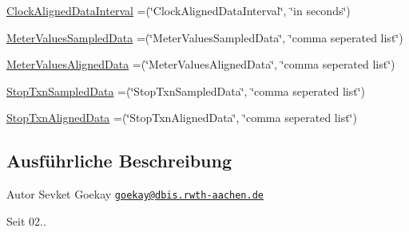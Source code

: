 \begin{DoxyCompactItemize}
\item 
\hyperlink{enumde_1_1rwth_1_1idsg_1_1steve_1_1web_1_1dto_1_1ocpp15_1_1_configuration_key_enum_a07d1dbf64e1bb3c3b50f09bada11d31d}{Clock\-Aligned\-Data\-Interval} =(\char`\"{}Clock\-Aligned\-Data\-Interval\char`\"{}, \char`\"{}in seconds\char`\"{})
\item 
\hyperlink{enumde_1_1rwth_1_1idsg_1_1steve_1_1web_1_1dto_1_1ocpp15_1_1_configuration_key_enum_ad95d1535d068131de3ce7769885d5e16}{Meter\-Values\-Sampled\-Data} =(\char`\"{}Meter\-Values\-Sampled\-Data\char`\"{}, \char`\"{}comma seperated list\char`\"{})
\item 
\hyperlink{enumde_1_1rwth_1_1idsg_1_1steve_1_1web_1_1dto_1_1ocpp15_1_1_configuration_key_enum_ac9e6b9e49500040c370a101ea6c8d71a}{Meter\-Values\-Aligned\-Data} =(\char`\"{}Meter\-Values\-Aligned\-Data\char`\"{}, \char`\"{}comma seperated list\char`\"{})
\item 
\hyperlink{enumde_1_1rwth_1_1idsg_1_1steve_1_1web_1_1dto_1_1ocpp15_1_1_configuration_key_enum_ac518bfd2cc29fef1a5d331b4819e72d8}{Stop\-Txn\-Sampled\-Data} =(\char`\"{}Stop\-Txn\-Sampled\-Data\char`\"{}, \char`\"{}comma seperated list\char`\"{})
\item 
\hyperlink{enumde_1_1rwth_1_1idsg_1_1steve_1_1web_1_1dto_1_1ocpp15_1_1_configuration_key_enum_a81e4a64dd31a431a1ca5b118f431e18a}{Stop\-Txn\-Aligned\-Data} =(\char`\"{}Stop\-Txn\-Aligned\-Data\char`\"{}, \char`\"{}comma seperated list\char`\"{})
\end{DoxyCompactItemize}


\subsection{Ausführliche Beschreibung}
\begin{DoxyAuthor}{Autor}
Sevket Goekay \href{mailto:goekay@dbis.rwth-aachen.de}{\tt goekay@dbis.\-rwth-\/aachen.\-de} 
\end{DoxyAuthor}
\begin{DoxySince}{Seit}
02.. 
\end{DoxySince}


